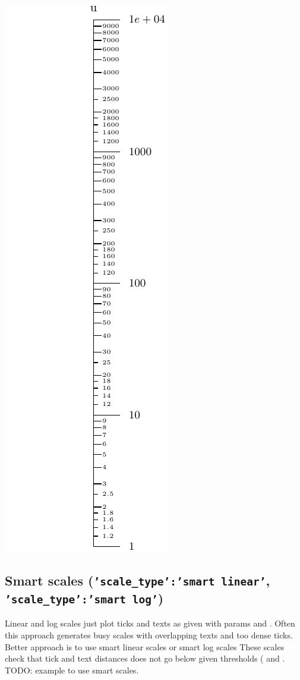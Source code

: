 \documentclass[a4paper,11pt,english]{sphinxmanual}
\begin{document}
\includegraphics{ex_axes_9.pdf}


\subsection{Smart scales (\texttt{'scale\_type':'smart linear'}, \texttt{'scale\_type':'smart log'})}
\label{axes/axes:smart-scales-scale-type-smart-linear-scale-type-smart-log}
Linear and log scales just plot ticks and texts as given with params  and . Often
this approach generates busy scales with overlapping texts and too dense ticks. Better approach is to use smart
linear scales  or smart log scales  These scales check that
tick and text distances does not go below given thresholds ( and  .
TODO: example to use smart scales.
\end{document}
